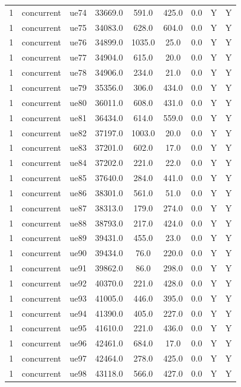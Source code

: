 \begin{table}[ht]
\begin{tabular}{|c|c|c|c|c|c|c|c|c|}
1 & concurrent & ue74 & 33669.0 & 591.0 & 425.0 & 0.0 & Y & Y \\
1 & concurrent & ue75 & 34083.0 & 628.0 & 604.0 & 0.0 & Y & Y \\
1 & concurrent & ue76 & 34899.0 & 1035.0 & 25.0 & 0.0 & Y & Y \\
1 & concurrent & ue77 & 34904.0 & 615.0 & 20.0 & 0.0 & Y & Y \\
1 & concurrent & ue78 & 34906.0 & 234.0 & 21.0 & 0.0 & Y & Y \\
1 & concurrent & ue79 & 35356.0 & 306.0 & 434.0 & 0.0 & Y & Y \\
1 & concurrent & ue80 & 36011.0 & 608.0 & 431.0 & 0.0 & Y & Y \\
1 & concurrent & ue81 & 36434.0 & 614.0 & 559.0 & 0.0 & Y & Y \\
1 & concurrent & ue82 & 37197.0 & 1003.0 & 20.0 & 0.0 & Y & Y \\
1 & concurrent & ue83 & 37201.0 & 602.0 & 17.0 & 0.0 & Y & Y \\
1 & concurrent & ue84 & 37202.0 & 221.0 & 22.0 & 0.0 & Y & Y \\
1 & concurrent & ue85 & 37640.0 & 284.0 & 441.0 & 0.0 & Y & Y \\
1 & concurrent & ue86 & 38301.0 & 561.0 & 51.0 & 0.0 & Y & Y \\
1 & concurrent & ue87 & 38313.0 & 179.0 & 274.0 & 0.0 & Y & Y \\
1 & concurrent & ue88 & 38793.0 & 217.0 & 424.0 & 0.0 & Y & Y \\
1 & concurrent & ue89 & 39431.0 & 455.0 & 23.0 & 0.0 & Y & Y \\
1 & concurrent & ue90 & 39434.0 & 76.0 & 220.0 & 0.0 & Y & Y \\
1 & concurrent & ue91 & 39862.0 & 86.0 & 298.0 & 0.0 & Y & Y \\
1 & concurrent & ue92 & 40370.0 & 221.0 & 428.0 & 0.0 & Y & Y \\
1 & concurrent & ue93 & 41005.0 & 446.0 & 395.0 & 0.0 & Y & Y \\
1 & concurrent & ue94 & 41390.0 & 405.0 & 227.0 & 0.0 & Y & Y \\
1 & concurrent & ue95 & 41610.0 & 221.0 & 436.0 & 0.0 & Y & Y \\
1 & concurrent & ue96 & 42461.0 & 684.0 & 17.0 & 0.0 & Y & Y \\
1 & concurrent & ue97 & 42464.0 & 278.0 & 425.0 & 0.0 & Y & Y \\
1 & concurrent & ue98 & 43118.0 & 566.0 & 427.0 & 0.0 & Y & Y \\

\end{tabular}
\end{table}
